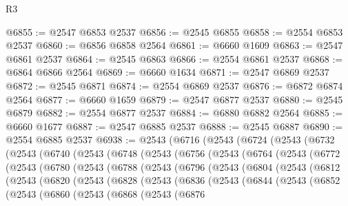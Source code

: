 \begin{lexlean}{R3}
\begin{coremodule}
@6855 := @2547 @6853 @2537
@6856 := @2545 @6855
@6858 := @2554 @6853 @2537
@6860 := @6856 @6858 @2564
@6861 := @6660 @1609
@6863 := @2547 @6861 @2537
@6864 := @2545 @6863
@6866 := @2554 @6861 @2537
@6868 := @6864 @6866 @2564
@6869 := @6660 @1634
@6871 := @2547 @6869 @2537
@6872 := @2545 @6871
@6874 := @2554 @6869 @2537
@6876 := @6872 @6874 @2564
@6877 := @6660 @1659
@6879 := @2547 @6877 @2537
@6880 := @2545 @6879
@6882 := @2554 @6877 @2537
@6884 := @6880 @6882 @2564
@6885 := @6660 @1677
@6887 := @2547 @6885 @2537
@6888 := @2545 @6887
@6890 := @2554 @6885 @2537
@6938 := @2543
    (@6716
      (@2543
        (@6724
          (@2543
            (@6732
              (@2543
                (@6740
                  (@2543
                    (@6748
                      (@2543
                        (@6756
                          (@2543
                            (@6764
                              (@2543
                                (@6772
                                  (@2543
                                    (@6780
                                      (@2543
                                        (@6788
                                          (@2543
                                            (@6796
                                              (@2543
                                                (@6804
                                                  (@2543
                                                    (@6812
                                                      (@2543
                                                        (@6820
                                                          (@2543
                                                            (@6828
                                                              (@2543
                                                                (@6836
                                                                  (@2543
                                                                    (@6844
                                                                      (@2543
                                                                        (@6852
                                                                          (@2543
                                                                            (@6860
                                                                              (@2543
                                                                                (@6868
                                                                                  (@2543
                                                                                    (@6876

\end{coremodule}
\end{lexlean}
